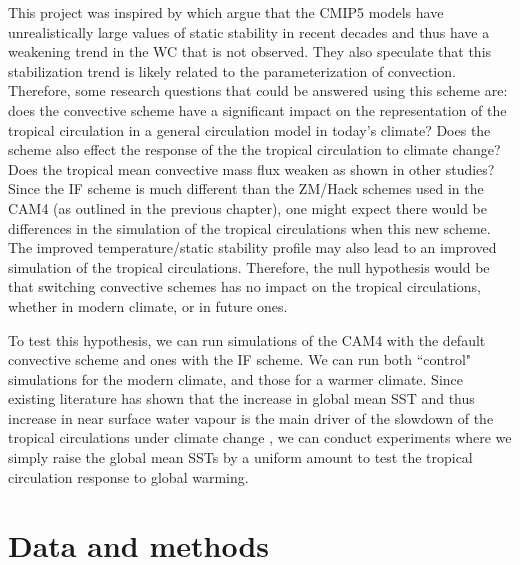 \documentclass[letterpaper,12pt,titlepage,oneside,final]{book}
\begin{document}
This project was inspired by \citep{sohn_role_2016} which argue that the CMIP5 models have unrealistically large values of static stability in recent decades and thus have a weakening trend in the WC that is not observed. They also speculate that this stabilization trend is likely related to the parameterization of convection. Therefore, some research questions that could be answered using this scheme are: does the convective scheme have a significant impact on the representation of the tropical circulation in a general circulation model in today's climate? Does the scheme also effect the response of the the tropical circulation to climate change? Does the tropical mean convective mass flux weaken as shown in other studies? Since the IF scheme is much different than the ZM/Hack schemes used in the CAM4 (as outlined in the previous chapter), one might expect there would be differences in the simulation of the tropical circulations when this new scheme. The improved temperature/static stability profile may also lead to an improved simulation of the tropical circulations. Therefore, the null hypothesis would be that switching convective schemes has no impact on the tropical circulations, whether in modern climate, or in future ones.

 To test this hypothesis, we can run simulations of the CAM4 with the default convective scheme and ones with the IF scheme. We can run both ``control" simulations for the modern climate, and those for a warmer climate. Since existing literature has shown that the increase in global mean SST and thus increase in near surface water vapour is the main driver of the slowdown of the tropical circulations under climate change \citep{held_robust_2006,ma_mechanisms_2011,vecchi_global_2007,he_anthropogenic_2015}, we can conduct experiments where we simply raise the global mean SSTs by a uniform amount to test the tropical circulation response to global warming.

\chapter{Data and methods}
\end{document}
